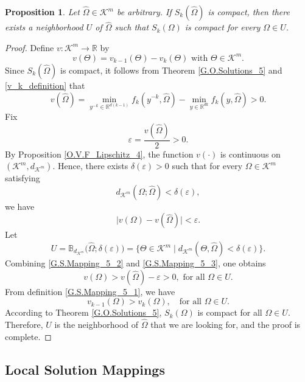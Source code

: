 \documentclass[sn-mathphys-num]{sn-jnl}%
\def\Hat{\widehat}
\def\R{\mathbb{R}}
\newtheorem{proposition}[theorem]{Proposition}
\theoremstyle{definition}
\begin{document}
\color{black}
\begin{proposition}
	\label{G.S.Mapping_5}
	Let $\Hat\Omega\in \mathcal{K}^m $ be arbitrary. If $S_k(\Hat \Omega)$ is compact, then there exists a neighborhood $U$ of $\Hat \Omega$ such that $S_k(\Omega)$ is compact for every $\Omega \in U$.
\end{proposition}
\begin{proof}
	Define $v:\mathcal{K}^m \to \R$ by
	\begin{equation}
		\label{G.S.Mapping_5_1}
		v(\Theta)=v_{k-1}(\Theta)-v_k(\Theta) \text{ with } \Theta \in \mathcal{K}^m.
	\end{equation}
	Since $S_k(\Hat \Omega)$ is compact, it follows from Theorem \ref{G.O.Solutions_5} and \eqref{v_k_definition} that
	\begin{equation}
		\label{G.S.Mapping_5_2}
		v(\Hat \Omega)=\min_{y^{-k} \in \mathbb{R}^{d(k-1)}}f_k(y^{-k},\Hat\Omega)-\min_{y \in \mathbb{R}^{dk}}f_k(y,\Hat\Omega)>0.
	\end{equation}
	Fix
	\[
	\varepsilon=\frac{v(\Hat\Omega)}{2}>0.
	\]By Proposition \ref{O.V.F_Lipschitz_4}, the function $v(\cdot)$ is continuous on $(\mathcal{K}^m,d_{\mathcal{K}^m})$. Hence, there exists $\delta(\varepsilon)>0$ such that for every $\Omega \in \mathcal{K}^m$ satisfying
	\[
    d_{\mathcal{K}^m}(\Omega;\Hat\Omega)<\delta(\varepsilon),
    \]
    we have
	\begin{equation}
		\label{G.S.Mapping_5_3}
		\bigl|v(\Omega)-v(\Hat\Omega)\bigr|<\varepsilon. 
	\end{equation}
	Let 
	\[
	U=\mathbb{B}_{d_{\mathcal{K}^m}}\bigl(\Hat\Omega;\delta(\varepsilon)\bigr)=\bigr\{ \Theta\in \mathcal{K}^m\mid d_{\mathcal{K}^m}(\Theta,\Hat\Omega)<\delta(\varepsilon)\bigl\}.
	\]
	Combining \eqref{G.S.Mapping_5_2} and \eqref{G.S.Mapping_5_3}, one obtains
	\[
	v({\Omega})>v(\Hat\Omega)-\varepsilon>0,  \text{ for all } \Omega \in U.
	\]
    From definition \eqref{G.S.Mapping_5_1}, we have
	\[
	v_{k-1}(\Omega)>v_k(\Omega), \quad \text{for all } \Omega \in U.
	\]
	According to Theorem \ref{G.O.Solutions_5}, $S_k(\Omega)$ is compact for all $\Omega \in U$. Therefore, $U$ is the neighborhood of $\Hat\Omega$ that we are looking for, and the proof is complete.
\end{proof}




\subsection{Local Solution Mappings}
\end{document}
